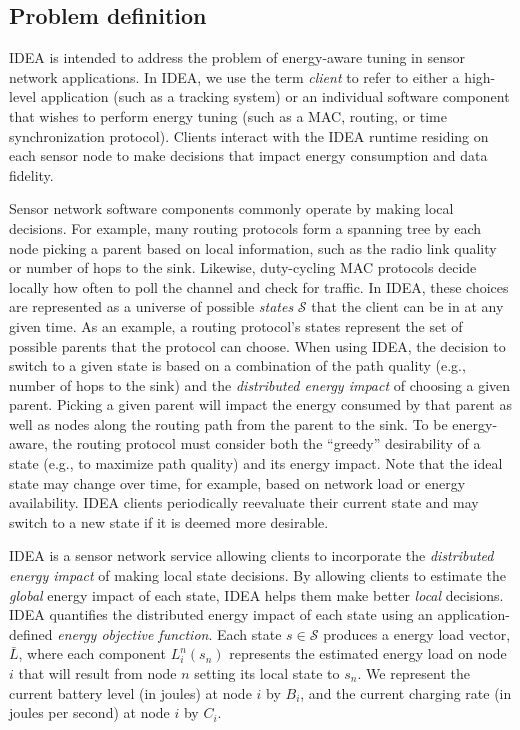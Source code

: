 \subsection{Problem definition}

IDEA is intended to address the problem of energy-aware tuning in
sensor network applications. In IDEA, we use the term {\em client} 
to refer to either a high-level application (such as a tracking system) 
or an individual software component that wishes to perform energy tuning 
(such as a MAC, routing, or time synchronization protocol). Clients
interact with the IDEA runtime residing on each sensor node 
to make decisions that impact energy consumption and data fidelity.

Sensor network software components commonly operate by making local
decisions. For example, many routing protocols form a spanning tree by each
node picking a parent based on local information, such as the radio link
quality or number of hops to the sink.  Likewise, duty-cycling MAC protocols
decide locally how often to poll the channel and check for traffic. In IDEA,
these choices are represented as a universe of possible {\em states}
$\mathcal{S}$ that the client can be in at any given time.  As an example, a
routing protocol's states represent the set of possible parents that the
protocol can choose. When using IDEA, the decision to switch to a given state
is based on a combination of the path quality (e.g., number of hops to the
sink) and the {\em distributed energy impact} of choosing a given parent.
Picking a given parent will impact the energy consumed by that parent as well
as nodes along the routing path from the parent to the sink. To be
energy-aware, the routing protocol must consider both the ``greedy''
desirability of a state (e.g., to maximize path quality) and its energy
impact.  Note that the ideal state may change over time, for example, based
on network load or energy availability. IDEA clients periodically reevaluate
their current state and may switch to a new state if it is deemed more
desirable.

IDEA is a sensor network service allowing clients to incorporate the {\em
distributed energy impact} of making local state decisions. By allowing
clients to estimate the \textit{global} energy impact of each state, IDEA
helps them make better \textit{local} decisions. IDEA quantifies the
distributed energy impact of each state using an application-defined
\textit{energy objective function}.  Each state $s \in \mathcal{S}$ produces
a energy load vector, $\bar{L}$, where each component $L_i^n(s_n)$ represents
the estimated energy load on node $i$ that will result from node $n$ setting
its local state to $s_n$.  We represent the current battery level (in joules)
at node $i$ by $B_i$, and the current charging rate (in joules per second) at
node $i$ by $C_i$.

